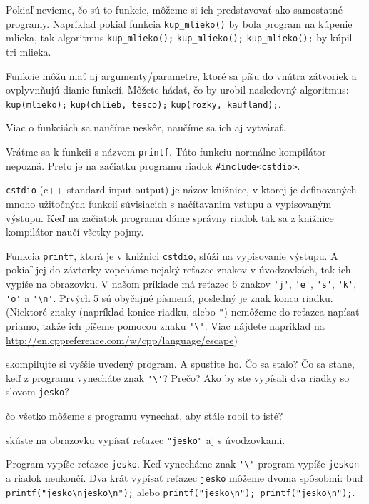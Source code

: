 \medskip

Pokiaľ nevieme, čo sú to funkcie, môžeme si ich predstavovať ako samostatné
programy. Napríklad pokiaľ funkcia \verb!kup_mlieko()! by bola program na
kúpenie mlieka, tak algoritmus \verb!kup_mlieko();! \verb!kup_mlieko();!
\verb!kup_mlieko();! by kúpil tri mlieka.

Funkcie môžu mať aj argumenty/parametre, ktoré sa píšu do vnútra zátvoriek a
ovplyvnňujú dianie funkcií. Môžete hádať, čo by urobil nasledovný algoritmus:
\verb!kup(mlieko);! \verb!kup(chlieb, tesco);! \verb!kup(rozky, kaufland);!.

Viac o funkciách sa naučíme neskôr, naučíme sa ich aj vytvárať.

\medskip

Vráťme sa k funkcii s názvom \verb!printf!. Túto funkciu normálne kompilátor
nepozná.  Preto je na začiatku programu riadok \verb!#include<cstdio>!.

\verb!cstdio! (c++ standard input output) je názov knižnice, v ktorej je
definovaných mnoho užitočných funkcií súvisiacich s načítavanim vstupu a
vypisovaným výstupu. Keď na začiatok programu dáme správny riadok tak sa z
knižnice kompilátor naučí všetky pojmy.

Funkcia \verb!printf!, ktorá je v knižnici \verb!cstdio!, slúži na vypisovanie
výstupu.  A pokiaľ jej do závtorky vopcháme nejaký reťazec znakov v
úvodzovkách, tak ich vypíše na obrazovku.  V našom príklade má reťazec 6 znakov
\verb!'j'!, \verb!'e'!, \verb!'s'!, \verb!'k'!, \verb!'o'! a \verb!'\n'!.
Prvých 5 sú obyčajné písmená, posledný je znak konca riadku. (Niektoré znaky
(napríklad koniec riadku, alebo \verb!"!) nemôžeme do reťazca napísať priamo,
takže ich píšeme pomocou znaku \verb!'\'!. Viac nájdete napríklad na
\url{http://en.cppreference.com/w/cpp/language/escape})

\medskip

\cvicenie skompilujte si vyššie uvedený program. A spustite ho. Čo sa stalo?
Čo sa stane, keď z programu vynecháte znak \verb!'\'!? Prečo?  Ako by ste
vypísali dva riadky so slovom \verb!jesko!?

\cvicenie čo všetko môžeme s programu vynechať, aby stále robil to isté?
 
\cvicenie skúste na obrazovku vypísať reťazec \verb!"jesko"! aj s
úvodzovkami.

\riesenie Program vypíše reťazec \verb"jesko". Keď vynecháme znak \verb!'\'!
program vypíše \verb"jeskon" a riadok neukončí.  Dva krát vypísať reťazec
\verb"jesko" môžeme dvoma spôsobmi: buď \verb!printf("jesko\njesko\n");! alebo
\verb!printf("jesko\n"); printf("jesko\n");!.

